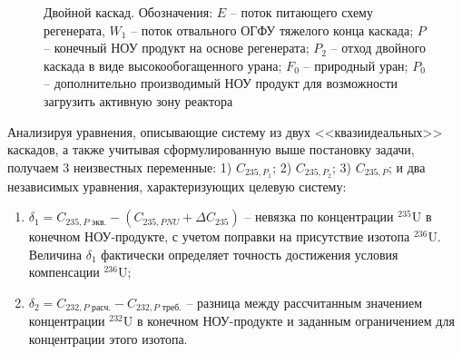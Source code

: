 \begin{figure}[ht]
  \caption{Двойной каскад. Обозначения: $E$ -- поток питающего схему регенерата, $W_1$ -- поток отвального ОГФУ тяжелого конца каскада; $P$ -- конечный НОУ продукт на основе регенерата; $P_2$ -- отход двойного каскада в виде высокообогащенного урана; $F_0$ -- природный уран; $P_0$ -- дополнительно производимый НОУ продукт для возможности загрузить активную зону реактора}\label{fig:double_ru_in3}
\end{figure}

Анализируя уравнения, описывающие систему из двух <<квазиидеальных>> каскадов, а также учитывая сформулированную выше постановку задачи, получаем 3 неизвестных переменные: 1) $C_{235, P_1}$; 2) $C_{235, P_2}$; 3) $C_{235, P}$; и два независимых уравнения, характеризующих целевую систему:

\begin{enumerate}
    \item $\delta_{1}=C_{235,P\textit{ экв.}}-(C_{235,P\textit{NU}}+\Delta C_{235})$ -- невязка по концентрации $^{235}$U в конечном НОУ-продукте, с учетом поправки на присутствие изотопа $^{236}$U. Величина $\delta_{1}$ фактически определяет точность достижения условия компенсации $^{236}$U;
    \item $\delta_{2}=C_{232,P\textit{ расч.}}-C_{232,P\textit{ треб.}}$ -- разница между рассчитанным значением концентрации $^{232}$U в конечном НОУ-продукте и заданным ограничением для концентрации этого изотопа.
\end{enumerate}


